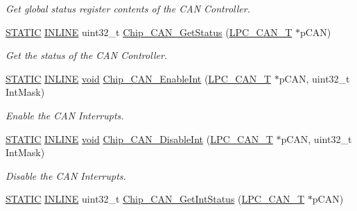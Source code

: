 \begin{DoxyCompactItemize}
\begin{DoxyCompactList}\small\item\em Get global status register contents of the C\-A\-N Controller. \end{DoxyCompactList}\item 
\hyperlink{group__LPC__Types__Public__Macros_ga10b2d890d871e1489bb02b7e70d9bdfb}{S\-T\-A\-T\-I\-C} \hyperlink{group__LPC__Types__Public__Types_ga2eb6f9e0395b47b8d5e3eeae4fe0c116}{I\-N\-L\-I\-N\-E} uint32\-\_\-t \hyperlink{group__CAN__17XX__40XX_gaa7142c33df0796bd194ba44629923b6d}{Chip\-\_\-\-C\-A\-N\-\_\-\-Get\-Status} (\hyperlink{structLPC__CAN__T}{L\-P\-C\-\_\-\-C\-A\-N\-\_\-\-T} $\ast$p\-C\-A\-N)
\begin{DoxyCompactList}\small\item\em Get the status of the C\-A\-N Controller. \end{DoxyCompactList}\item 
\hyperlink{group__LPC__Types__Public__Macros_ga10b2d890d871e1489bb02b7e70d9bdfb}{S\-T\-A\-T\-I\-C} \hyperlink{group__LPC__Types__Public__Types_ga2eb6f9e0395b47b8d5e3eeae4fe0c116}{I\-N\-L\-I\-N\-E} \hyperlink{Paradigm_2Tern__EE_2small_2portmacro_8h_a14d32f8130d3c0b212cfc751730b5b49}{void} \hyperlink{group__CAN__17XX__40XX_ga9b5dfccc60fec9c7da50ea7ee3515a63}{Chip\-\_\-\-C\-A\-N\-\_\-\-Enable\-Int} (\hyperlink{structLPC__CAN__T}{L\-P\-C\-\_\-\-C\-A\-N\-\_\-\-T} $\ast$p\-C\-A\-N, uint32\-\_\-t Int\-Mask)
\begin{DoxyCompactList}\small\item\em Enable the C\-A\-N Interrupts. \end{DoxyCompactList}\item 
\hyperlink{group__LPC__Types__Public__Macros_ga10b2d890d871e1489bb02b7e70d9bdfb}{S\-T\-A\-T\-I\-C} \hyperlink{group__LPC__Types__Public__Types_ga2eb6f9e0395b47b8d5e3eeae4fe0c116}{I\-N\-L\-I\-N\-E} \hyperlink{Paradigm_2Tern__EE_2small_2portmacro_8h_a14d32f8130d3c0b212cfc751730b5b49}{void} \hyperlink{group__CAN__17XX__40XX_ga5dcf82fd6e7df4b699e32249eb3021dd}{Chip\-\_\-\-C\-A\-N\-\_\-\-Disable\-Int} (\hyperlink{structLPC__CAN__T}{L\-P\-C\-\_\-\-C\-A\-N\-\_\-\-T} $\ast$p\-C\-A\-N, uint32\-\_\-t Int\-Mask)
\begin{DoxyCompactList}\small\item\em Disable the C\-A\-N Interrupts. \end{DoxyCompactList}\item 
\hyperlink{group__LPC__Types__Public__Macros_ga10b2d890d871e1489bb02b7e70d9bdfb}{S\-T\-A\-T\-I\-C} \hyperlink{group__LPC__Types__Public__Types_ga2eb6f9e0395b47b8d5e3eeae4fe0c116}{I\-N\-L\-I\-N\-E} uint32\-\_\-t \hyperlink{group__CAN__17XX__40XX_ga40be5e20a794a039df4465b164d50f74}{Chip\-\_\-\-C\-A\-N\-\_\-\-Get\-Int\-Status} (\hyperlink{structLPC__CAN__T}{L\-P\-C\-\_\-\-C\-A\-N\-\_\-\-T} $\ast$p\-C\-A\-N)

\end{DoxyCompactItemize}

